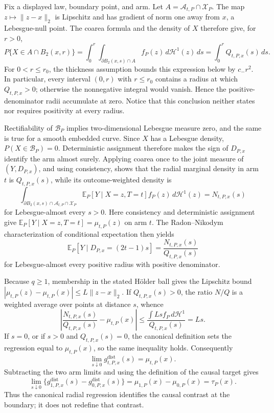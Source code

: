 Fix a displayed law, boundary point, and arm.  Let \(A=\mathcal A_{t,P}\cap\mathcal X_P\).  The map \(z\mapsto\lVert z-x\rVert_2\) is Lipschitz and has gradient of norm one away from \(x\), a Lebesgue-null point.  The coarea formula and the density of \(X\) therefore give, for \(r>0\),
\[
P\{X\in A\cap B_2(x,r)\}
=\int_0^r\int_{\partial B_2(x,s)\cap A}f_P(z)\,d\mathcal H^1(z)\,ds
=\int_0^rQ_{t,P,x}(s)\,ds.
\]
For \(0<r\leq r_0\), the thickness assumption bounds this expression below by \(c_-r^2\).  In particular, every interval \((0,r)\) with \(r\leq r_0\) contains a radius at which \(Q_{t,P,x}>0\); otherwise the nonnegative integral would vanish.  Hence the positive-denominator radii accumulate at zero.  Notice that this conclusion neither states nor requires positivity at every radius.

Rectifiability of \(\mathcal B_P\) implies two-dimensional Lebesgue measure zero, and the same is true for a smooth embedded curve.  Since \(X\) has a Lebesgue density, \(P(X\in\mathcal B_P)=0\).  Deterministic assignment therefore makes the sign of \(D_{P,x}\) identify the arm almost surely.  Applying coarea once to the joint measure of \((Y,D_{P,x})\), and using consistency, shows that the radial marginal density in arm \(t\) is \(Q_{t,P,x}(s)\), while its outcome-weighted density is
\[
\int_{\partial B_2(x,s)\cap\mathcal A_{t,P}\cap\mathcal X_P}
\mathbb E_P[Y\mid X=z,T=t]f_P(z)\,d\mathcal H^1(z)
=N_{t,P,x}(s)
\]
for Lebesgue-almost every \(s>0\).  Here consistency and deterministic assignment give \(\mathbb E_P[Y\mid X=z,T=t]=\mu_{t,P}(z)\) on arm \(t\).  The Radon--Nikodym characterization of conditional expectation then yields
\[
\mathbb E_P[Y\mid D_{P,x}=(2t-1)s]
=\frac{N_{t,P,x}(s)}{Q_{t,P,x}(s)}
\]
for Lebesgue-almost every positive radius with positive denominator.

Because \(q\geq1\), membership in the stated H\"older ball gives the Lipschitz bound
\(|\mu_{t,P}(z)-\mu_{t,P}(x)|\leq L\lVert z-x\rVert_2\).  If \(Q_{t,P,x}(s)>0\), the ratio \(N/Q\) is a weighted average over points at distance \(s\), whence
\[
\left|\frac{N_{t,P,x}(s)}{Q_{t,P,x}(s)}-\mu_{t,P}(x)\right|
\leq\frac{\int Ls f_P\,d\mathcal H^1}{Q_{t,P,x}(s)}=Ls.
\]
If \(s=0\), or if \(s>0\) and \(Q_{t,P,x}(s)=0\), the canonical definition sets the regression equal to \(\mu_{t,P}(x)\), so the same inequality holds.  Consequently
\[
\lim_{s\downarrow0}g^{\mathrm{dist}}_{t,P,x}(s)=\mu_{t,P}(x).
\]
Subtracting the two arm limits and using the definition of the causal target gives
\[
\lim_{s\downarrow0}\{g^{\mathrm{dist}}_{1,P,x}(s)-g^{\mathrm{dist}}_{0,P,x}(s)\}
=\mu_{1,P}(x)-\mu_{0,P}(x)=\tau_P(x).
\]
Thus the canonical radial regression identifies the causal contrast at the boundary; it does not redefine that contrast.